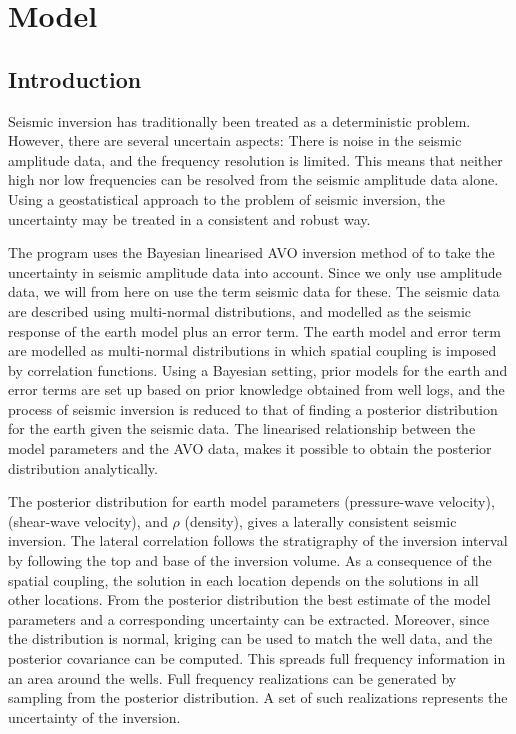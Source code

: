\chapter{Model}
\label{sec:theory}

\section{Introduction}
Seismic inversion has traditionally been treated as a deterministic
problem. However, there are several uncertain aspects: There is noise
in the seismic amplitude data, and the frequency resolution is
limited. This means that neither high nor low frequencies can be resolved from the
seismic amplitude data alone. Using a geostatistical approach to the problem of
seismic inversion, the uncertainty may be treated in a consistent and
robust way.

The \crava program uses the Bayesian linearised AVO
inversion method of \cite{geo68ab2} to take
the uncertainty in seismic amplitude data into account. Since we only use amplitude data, we will from here on use the term seismic data for these. The seismic data are
described using multi-normal distributions, and modelled as the seismic
response of the earth model plus an error term. The earth model and
error term are modelled as multi-normal distributions in which spatial
coupling is imposed by correlation functions. Using a Bayesian
setting, prior models for the earth and error terms are set up based
on prior knowledge obtained from well logs, and the process of seismic
inversion is reduced to that of finding a posterior distribution for
the earth given the seismic data. The linearised relationship between
the model parameters and the AVO data, makes it possible to obtain the
posterior distribution analytically.

The posterior distribution for earth model parameters \vp
(pressure-wave velocity), \vs (shear-wave velocity), and $\rho$
(density), gives a laterally consistent seismic inversion. The lateral
correlation follows the stratigraphy of the inversion interval by
following the top and base of the inversion volume. As a consequence
of the spatial coupling, the solution in each location depends on the
solutions in all other locations. From the posterior distribution the
best estimate of the model parameters and a corresponding uncertainty
can be extracted. Moreover, since the distribution is normal, kriging
can be used to match the well data, and the posterior covariance can
be computed. This spreads full frequency information in an area around
the wells. Full frequency realizations can be generated by sampling
from the posterior distribution. A set of such realizations represents
the uncertainty of the inversion.

